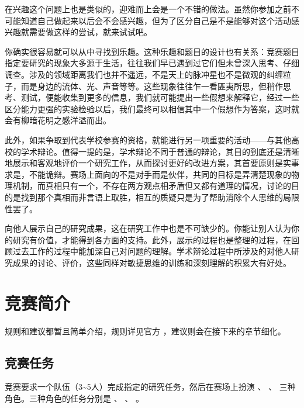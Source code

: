 \documentclass[a4paper,10pt,english]{sphinxmanual}
\begin{document}
在兴趣这个问题上也是类似的，迎难而上会是一个不错的做法。虽然你参加之前不可能知道自己做起来以后会不会感兴趣，但为了区分自己是不是能够对这个活动感兴趣就需要做这样的尝试，就来试试吧。

你确实很容易就可以从中寻找到乐趣。这种乐趣和题目的设计也有关系：竞赛题目指定要研究的现象大多源于生活，往往我们早已遇到过它们但未曾深入思考、仔细调查。涉及的领域距离我们也并不遥远，不是天上的脉冲星也不是微观的纠缠粒子，而是身边的流体、光、声音等等。这些现象往往乍一看匪夷所思，但稍作思考、测试，便能收集到更多的信息，我们就可能提出一些假想来解释它，经过一些区分能力更强的实验检验以后，我们最终可以相信其中一个假想作为答案，这时就会有柳暗花明之感洋溢而出。

此外，如果争取到代表学校参赛的资格，就能进行另一项重要的活动——与其他高校的学术辩论。值得一提的是，学术辩论不同于普通的辩论，其目的到底还是清晰地展示和客观地评价一个研究工作，从而探讨更好的改进方案，其首要原则是实事求是，不能诡辩。赛场上面向的不是对手而是伙伴，共同的目标是弄清楚现象的物理机制，而真相只有一个，不存在两方观点相矛盾但又都有道理的情况，讨论的目的是找到那个真相而非言语上取胜，相互的质疑只是为了帮助消除个人思维的局限性罢了。

向他人展示自己的研究成果，这在研究工作中也是不可缺少的。你能让别人认为你的研究有价值，才能得到各方面的支持。此外，展示的过程也是整理的过程，在回顾过去工作的过程中能加深自己对问题的理解。学术辩论过程中所涉及的对他人研究成果的讨论、评价，这些同样对敏捷思维的训练和深刻理解的积累大有好处。


\chapter{竞赛简介}
\label{\detokenize{2. Intro_Tournament::doc}}\label{\detokenize{2. Intro_Tournament:id1}}
规则和建议都暂且简单介绍，规则详见官方  ，建议则会在接下来的章节细化。


\section{竞赛任务}
\label{\detokenize{2. Intro_Tournament:id2}}
竞赛要求一个队伍（3\textasciitilde{}5人）完成指定的研究任务，然后在赛场上扮演  、  、  三种角色。三种角色的任务分别是  、  、  。
\end{document}
